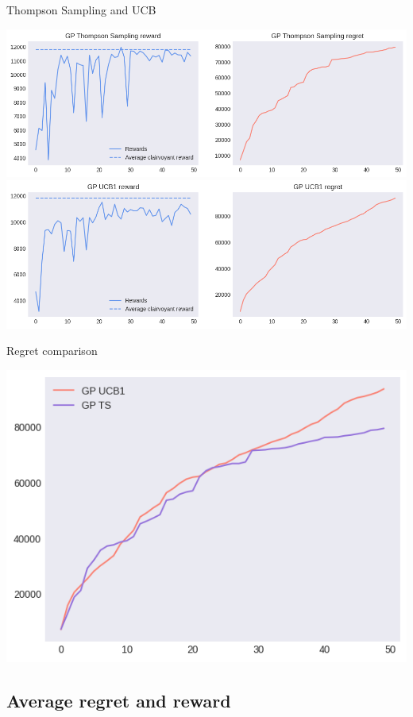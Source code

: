 Thompson Sampling and UCB

\begin{center}
	\includegraphics[scale=0.5]{img/Graphs/uncertain_alpha_unit/image1.png}
	\includegraphics[scale=0.5]{img/Graphs/uncertain_alpha_unit/image2.png}
\end{center}

Regret comparison

\begin{center}
	\includegraphics[scale=0.5]{img/Graphs/uncertain_alpha_unit/image3.png}
\end{center}

\subsection{Average regret and reward}

